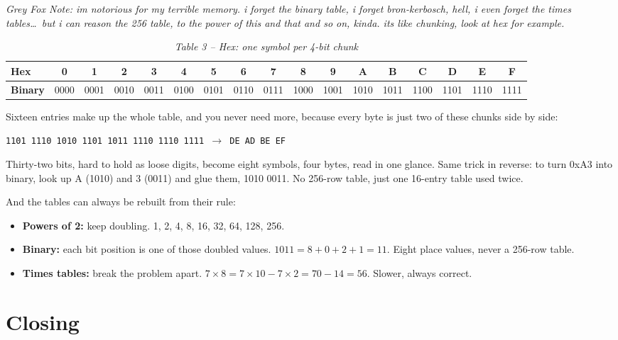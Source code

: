 \documentclass[11pt,a4paper]{article}
\newcommand{\gfnote}[1]{\par{\itshape Grey Fox Note: #1}\par}
\begin{document}
\gfnote{im notorious for my terrible memory. i forget the binary table, i forget
bron-kerbosch, hell, i even forget the times tables\ldots\ but i can reason the 256 table, to the
power of this and that and so on, kinda. its like chunking, look at hex for example.}

\begin{table}[H]
\centering
\caption*{\itshape Table 3 -- Hex: one symbol per 4-bit chunk}
\footnotesize
\setlength{\tabcolsep}{2.6pt}
\begin{tabular}{@{}l*{16}{c}@{}}
\toprule
\textbf{Hex} & 0 & 1 & 2 & 3 & 4 & 5 & 6 & 7 & 8 & 9 & A & B & C & D & E & F \\
\midrule
\textbf{Binary} & 0000 & 0001 & 0010 & 0011 & 0100 & 0101 & 0110 & 0111 & 1000 & 1001 & 1010 & 1011 & 1100 & 1101 & 1110 & 1111 \\
\bottomrule
\end{tabular}
\end{table}

Sixteen entries make up the whole table, and you never need more, because every byte is just
two of these chunks side by side:

\begin{center}
\texttt{1101 1110 1010 1101 1011 1110 1110 1111 $\rightarrow$ DE AD BE EF}
\end{center}

Thirty-two bits, hard to hold as loose digits, become eight symbols, four bytes, read in one
glance. Same trick in reverse: to turn 0xA3 into binary, look up A (1010) and 3 (0011) and
glue them, 1010 0011. No 256-row table, just one 16-entry table used twice.

And the tables can always be rebuilt from their rule:

\begin{itemize}
  \item \textbf{Powers of 2:} keep doubling. 1, 2, 4, 8, 16, 32, 64, 128, 256.
  \item \textbf{Binary:} each bit position is one of those doubled values. $1011 = 8 + 0 + 2 + 1 = 11$. Eight
        place values, never a 256-row table.
  \item \textbf{Times tables:} break the problem apart. $7 \times 8 = 7 \times 10 - 7 \times 2 = 70 - 14 = 56$. Slower,
        always correct.
\end{itemize}

\section{Closing}
\end{document}
